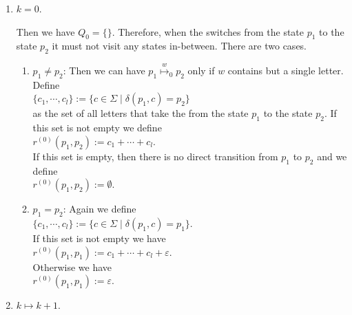 \begin{enumerate}
\item[B.C.:] $k = 0$.  

  Then we have $Q_0 = \{\}$.
  Therefore, when the  switches from the state $p_1$ to the state $p_2$ it must not visit any
  states in-between.  There are two cases.
  \begin{enumerate}
  \item $p_1 \not= p_2$:  Then we can have  $p_1 \stackrel{w}{\mapsto}_0 p_2$ only if $w$ contains but a
        single letter.  Define
        \\[0.2cm]
        \hspace*{1.3cm}
        $\{ c_1, \cdots, c_l \} := \{ c \in \Sigma \mid \delta(p_1,c) = p_2 \}$
        \\[0.2cm]
        as the set of all letters that take the  from the state $p_1$ to the state $p_2$.
        If this set is not empty we define 
        \\[0.2cm]
        \hspace*{1.3cm}
        $r^{(0)}(p_1, p_2) := c_1 + \cdots + c_l$. 
        \\[0.2cm]
        If this set is empty, then there is no direct transition from  $p_1$ to $p_2$ and we define
        \\[0.2cm]
        \hspace*{1.3cm}
        $r^{(0)}(p_1, p_2) := \emptyset$.
  \item $p_1 = p_2$:  Again we define
        \\[0.2cm]
        \hspace*{1.3cm}
        $\{ c_1, \cdots, c_l \} := \{ c \in \Sigma \mid \delta(p_1,c) = p_1 \}$.
        \\[0.2cm]
        If this set is not empty we have
        \\[0.2cm]
        \hspace*{1.3cm}
        $r^{(0)}(p_1, p_1) := c_1 + \cdots + c_l + \varepsilon$.
        \\[0.2cm]
        Otherwise we have
        \\[0.2cm]
        \hspace*{1.3cm}
        $r^{(0)}(p_1, p_1) := \varepsilon$.
   \end{enumerate}
\item[I.S.:] $k \mapsto k+1$.  


\end{enumerate}

